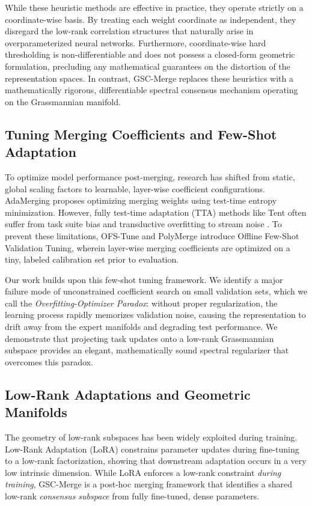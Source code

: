 While these heuristic methods are effective in practice, they operate strictly on a coordinate-wise basis. By treating each weight coordinate as independent, they disregard the low-rank correlation structures that naturally arise in overparameterized neural networks. Furthermore, coordinate-wise hard thresholding is non-differentiable and does not possess a closed-form geometric formulation, precluding any mathematical guarantees on the distortion of the representation spaces. In contrast, GSC-Merge replaces these heuristics with a mathematically rigorous, differentiable spectral consensus mechanism operating on the Grassmannian manifold.

\subsection{Tuning Merging Coefficients and Few-Shot Adaptation}
To optimize model performance post-merging, research has shifted from static, global scaling factors to learnable, layer-wise coefficient configurations. AdaMerging \cite{liang2023adamerging} proposes optimizing merging weights using test-time entropy minimization. However, fully test-time adaptation (TTA) methods like Tent \cite{wang2020tent} often suffer from task suite bias and transductive overfitting to stream noise \cite{liao2021are}. To prevent these limitations, OFS-Tune \cite{ofstune} and PolyMerge \cite{polymerge} introduce Offline Few-Shot Validation Tuning, wherein layer-wise merging coefficients are optimized on a tiny, labeled calibration set prior to evaluation.

Our work builds upon this few-shot tuning framework. We identify a major failure mode of unconstrained coefficient search on small validation sets, which we call the \emph{Overfitting-Optimizer Paradox}: without proper regularization, the learning process rapidly memorizes validation noise, causing the representation to drift away from the expert manifolds and degrading test performance. We demonstrate that projecting task updates onto a low-rank Grassmannian subspace provides an elegant, mathematically sound spectral regularizer that overcomes this paradox.

\subsection{Low-Rank Adaptations and Geometric Manifolds}
The geometry of low-rank subspaces has been widely exploited during training. Low-Rank Adaptation (LoRA) \cite{hu2021lora} constrains parameter updates during fine-tuning to a low-rank factorization, showing that downstream adaptation occurs in a very low intrinsic dimension. While LoRA enforces a low-rank constraint \emph{during training}, GSC-Merge is a post-hoc merging framework that identifies a shared low-rank \emph{consensus subspace} from fully fine-tuned, dense parameters. 

